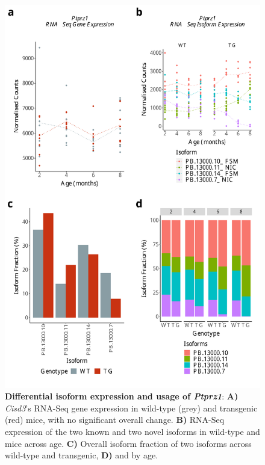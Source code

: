 \begin{figure}[htp]
	\begin{center}
		\includegraphics[page=1,scale = 0.55]{Figures/DIU_notDEG_nomajor.pdf}
	\end{center}
	\captionsetup{width=0.95\textwidth}
	\caption[Differential isoform expression and usage of \textit{Ptprz1}]%
	{\textbf{Differential isoform expression and usage of \textit{Ptprz1}}: \textbf{A)} \textit{Cisd3}'s RNA-Seq gene expression in wild-type (grey) and transgenic (red) mice, with no significant overall change. \textbf{B)} RNA-Seq expression of the two known and two novel isoforms in wild-type and mice across age. \textbf{C)} Overall isoform fraction of two isoforms across wild-type and transgenic, \textbf{D)} and by age.}    
	\label{fig:DIU_ptprz1}
\end{figure}


